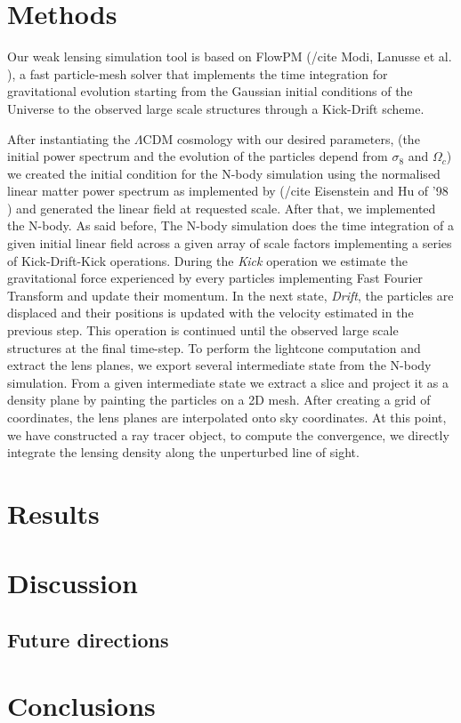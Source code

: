 \documentclass[twocolumn,twocolappendix]{aastex63}
\begin{document}


\section{Methods}

Our weak lensing simulation tool is based on FlowPM (/cite Modi, Lanusse et al. ), a fast particle-mesh solver that implements the time integration for gravitational evolution starting from the Gaussian initial conditions of the Universe to the observed large scale structures through a Kick-Drift scheme.


After instantiating the $\Lambda$CDM cosmology with our desired parameters, (the initial power spectrum and the evolution of the particles depend from $\sigma_8$ and $\Omega_{c}$) we created the initial condition for the N-body simulation using the normalised linear matter power spectrum as implemented by (/cite Eisenstein and Hu of '98 ) and generated the linear field at requested scale. After that, we implemented the N-body. As said before, The N-body simulation does the time integration of a given initial linear field  across a given array of scale factors implementing a series of Kick-Drift-Kick operations. 
During the \textit{Kick} operation we estimate the gravitational force experienced by every particles implementing Fast Fourier Transform and update their momentum. In the next state, \textit{Drift}, the particles are displaced and their positions is updated with the velocity estimated in the previous step. This operation is continued until the observed large scale structures at the final time-step.
To perform the lightcone computation and extract the lens planes,  we export several intermediate state from the N-body simulation. From a given intermediate state we extract a slice and project it as a density plane by painting the particles on a 2D mesh. 
After creating a grid of coordinates, the lens planes are interpolated onto sky coordinates. 
 At this point, we have constructed a ray tracer object, to compute the convergence, we directly integrate the lensing density along the unperturbed line of sight. 






\section{Results}

\section{Discussion}

\subsection{Future directions}

\section{Conclusions}

\end{document}
